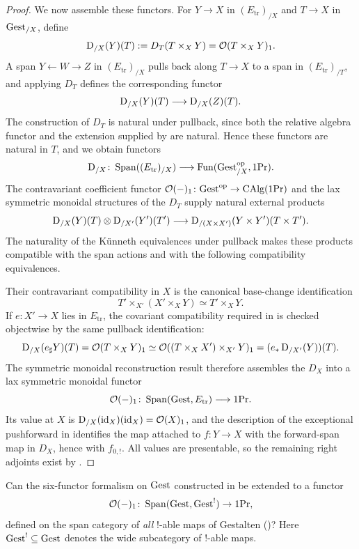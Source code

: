 \documentclass[11pt]{book}
\begin{document}
\begin{proof}
		We now assemble these functors. For $Y\to X$ in $(E_{\mathrm{tr}})_{/X}$ and $T\to X$ in ${\textup{Gest}}_{/X}$, define
		\[
			\operatorname{\mathrm{D}}_{/X}(Y)(T):=D_T(T\times_XY)=\mathcal{O}(T\times_XY)_1.
		\]
		A span $Y\xleftarrow{}W\xrightarrow{}Z$ in $(E_{\mathrm{tr}})_{/X}$ pulls back along $T\to X$ to a span in $(E_{\mathrm{tr}})_{/T}$, and applying $D_T$ defines the corresponding functor
		\[
			\operatorname{\mathrm{D}}_{/X}(Y)(T)\longrightarrow\operatorname{\mathrm{D}}_{/X}(Z)(T).
		\]
		The construction of $D_T$ is natural under pullback, since both the relative algebra functor and the extension supplied by  are natural. Hence these functors are natural in $T$, and we obtain functors
		\[
			\operatorname{\mathrm{D}}_{/X}\colon\operatorname{Span}((E_{\mathrm{tr}})_{/X})\longrightarrow\operatorname{Fun}({\textup{Gest}}_{/X}^{\textup{op}},1\textup{Pr}).
		\]
		The contravariant coefficient functor $\mathcal{O}(-)_1\colon{\textup{Gest}}^{\textup{op}}\to{\textup{CAlg}}(1\textup{Pr})$ and the lax symmetric monoidal structures of the $D_T$ supply natural external products
		\[
			\operatorname{\mathrm{D}}_{/X}(Y)(T)\otimes\operatorname{\mathrm{D}}_{/X'}(Y')(T')
			\longrightarrow
			\operatorname{\mathrm{D}}_{/(X\times X')}(Y\times Y')(T\times T').
		\]
		The naturality of the Künneth equivalences under pullback makes these products compatible with the span actions and with the following compatibility equivalences.

		Their contravariant compatibility in $X$ is the canonical base-change identification
		\[
			T'\times_{X'}(X'\times_XY)\simeq T'\times_XY.
		\]
		If $e\colon X'\to X$ lies in $E_{\mathrm{tr}}$, the covariant compatibility required in  is checked objectwise by the same pullback identification:
		\[
			\operatorname{\mathrm{D}}_{/X}(e_{\sharp}Y)(T)
			=\mathcal{O}(T\times_XY)_1
			\simeq
			\mathcal{O}((T\times_XX')\times_{X'}Y)_1
			=(e_*\operatorname{\mathrm{D}}_{/X'}(Y))(T).
		\]
		The symmetric monoidal reconstruction result  therefore assembles the $D_X$ into a lax symmetric monoidal functor
		\[
			\mathcal{O}(-)_1\colon\operatorname{Span}({\textup{Gest}},E_{\mathrm{tr}})\longrightarrow1\textup{Pr}.
		\]
		Its value at $X$ is $\operatorname{\mathrm{D}}_{/X}(\operatorname{id}_X)(\operatorname{id}_X)=\mathcal{O}(X)_1$, and the description of the exceptional pushforward in  identifies the map attached to $f\colon Y\to X$ with the forward-span map in $D_X$, hence with $f_{0,!}$. All values are presentable, so the remaining right adjoints exist by .
	\end{proof}

	\begin{question}
		Can the six-functor formalism on ${\textup{Gest}}$ constructed in  be extended to a functor
		\[
			\mathcal{O}(-)_1\colon \operatorname{Span}({\textup{Gest}}, {\textup{Gest}}^{!}) \to 1\textup{Pr},
		\]
		defined on the span category of \emph{all} $!$-able maps of Gestalten ()? Here ${\textup{Gest}}^{!} \subseteq {\textup{Gest}}$ denotes the wide subcategory of $!$-able maps.
	\end{question}
\end{document}
